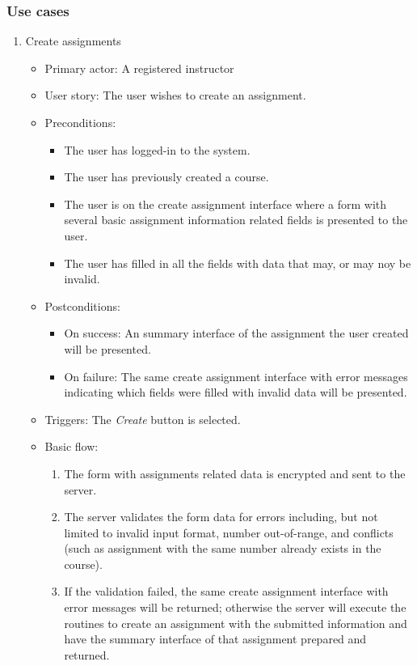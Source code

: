 \subsubsection{Use cases}
\begin{enumerate}
\item Create assignments
\begin{itemize}
    \item Primary actor: A registered instructor
    \item User story: The user wishes to create an assignment.
    \item Preconditions:
        \begin{itemize}
            \item The user has logged-in to the system.
            \item The user has previously created a course.
            \item The user is on the create assignment interface where a form
                with several basic assignment information related fields is
                presented to the user.
            \item The user has filled in all the fields with data that may,
                or may noy be invalid.
        \end{itemize}
    \item Postconditions:
        \begin{itemize}
            \item On success: An summary interface of the assignment the user
                created will be presented.
            \item On failure: The same create assignment interface with error
                messages indicating which fields were filled with invalid data
                will be presented.
        \end{itemize}
    \item Triggers: The \emph{Create} button is selected.
    \item Basic flow:
        \begin{enumerate}
            \item The form with assignments related data is encrypted and sent
                to the server.
            \item The server validates the form data for errors  including,
                but not limited to invalid input format,  number out-of-range,
                and conflicts (such as assignment with the same number already
                exists in the course).
            \item If the validation failed, the same create assignment interface
                with error messages will be returned; otherwise the server will
                execute the routines to create an assignment with the submitted
                information and have the summary interface of that assignment
                prepared and returned.
        \end{enumerate}
\end{itemize}


\end{enumerate}
